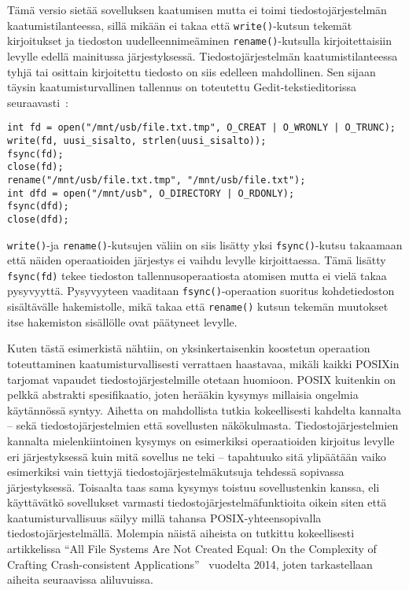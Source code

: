 Tämä versio sietää sovelluksen kaatumisen mutta ei toimi tiedostojärjestelmän kaatumistilanteessa,
sillä mikään ei takaa että \texttt{write()}-kutsun tekemät kirjoitukset ja tiedoston uudelleennimeäminen \texttt{rename()}-kutsulla kirjoitettaisiin levylle edellä mainitussa järjestyksessä.
Tiedostojärjestelmän kaatumistilanteessa tyhjä tai osittain kirjoitettu tiedosto on siis edelleen mahdollinen.
Sen sijaan täysin kaatumisturvallinen tallennus on toteutettu Gedit-tekstieditorissa seuraavasti~\cite{OptimisticCrashConsistency}:

\begin{verbatim}
int fd = open("/mnt/usb/file.txt.tmp", O_CREAT | O_WRONLY | O_TRUNC);
write(fd, uusi_sisalto, strlen(uusi_sisalto));
fsync(fd);
close(fd);
rename("/mnt/usb/file.txt.tmp", "/mnt/usb/file.txt");
int dfd = open("/mnt/usb", O_DIRECTORY | O_RDONLY);
fsync(dfd);
close(dfd);
\end{verbatim}

\texttt{write()}-ja \texttt{rename()}-kutsujen väliin on siis lisätty yksi \texttt{fsync()}-kutsu takaamaan että näiden operaatioiden järjestys ei vaihdu levylle kirjoittaessa.
Tämä lisätty \texttt{fsync(fd)} tekee tiedoston tallennusoperaatiosta atomisen mutta ei vielä takaa pysyvyyttä.
Pysyvyyteen vaaditaan \texttt{fsync()}-operaation suoritus kohdetiedoston sisältävälle hakemistolle,
mikä takaa että \texttt{rename()} kutsun tekemän muutokset itse hakemiston sisällölle ovat päätyneet levylle.

Kuten tästä esimerkistä nähtiin, on yksinkertaisenkin koostetun operaation toteuttaminen kaatumisturvallisesti verrattaen haastavaa,
mikäli kaikki POSIXin tarjomat vapaudet tiedostojärjestelmille otetaan huomioon.
POSIX kuitenkin on pelkkä abstrakti spesifikaatio, joten herääkin kysymys millaisia ongelmia käytännössä syntyy.
Aihetta on mahdollista tutkia kokeellisesti kahdelta kannalta -- sekä tiedostojärjestelmien että sovellusten näkökulmasta.
Tiedostojärjestelmien kannalta mielenkiintoinen kysymys on esimerkiksi operaatioiden kirjoitus levylle eri järjestyksessä kuin mitä sovellus ne teki --
tapahtuuko sitä ylipäätään vaiko esimerkiksi vain tiettyjä tiedostojärjestelmäkutsuja tehdessä sopivassa järjestyksessä.
Toisaalta taas sama kysymys toistuu sovellustenkin kanssa, eli käyttävätkö sovellukset varmasti tiedostojärjestelmäfunktioita oikein siten
että kaatumisturvallisuus säilyy millä tahansa POSIX-yhteensopivalla tiedostojärjestelmällä.
Molempia näistä aiheista on tutkittu kokeellisesti artikkelissa ``All File Systems Are Not Created Equal: On the Complexity of Crafting Crash-consistent Applications''~\cite{PosixDataConsistency} vuodelta 2014,
joten tarkastellaan aiheita seuraavissa aliluvuissa.

